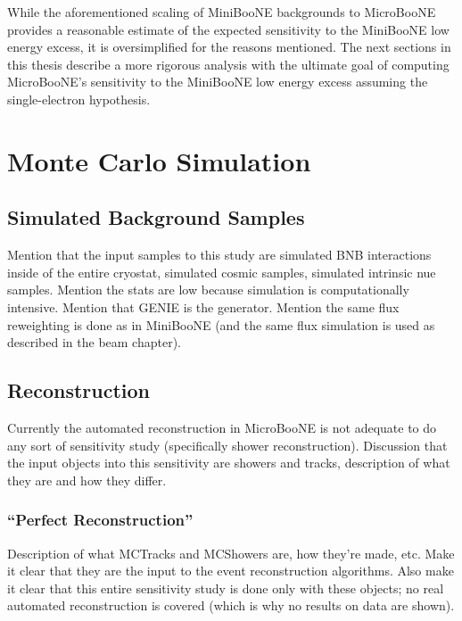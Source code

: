 While the aforementioned scaling of MiniBooNE backgrounds to MicroBooNE provides a reasonable estimate of the expected sensitivity to the MiniBooNE low energy excess, it is oversimplified for the reasons mentioned. The next sections in this thesis describe a more rigorous analysis with the ultimate goal of computing MicroBooNE's sensitivity to the MiniBooNE low energy excess assuming the single-electron hypothesis.














\section{Monte Carlo Simulation}

\subsection{Simulated Background Samples}
Mention that the input samples to this study are simulated BNB interactions inside of the entire cryostat, simulated cosmic samples, simulated intrinsic nue samples. Mention the stats are low because simulation is computationally intensive. Mention that GENIE is the generator. Mention the same flux reweighting is done as in MiniBooNE (and the same flux simulation is used as described in the beam chapter).

\subsection{Reconstruction}
Currently the automated reconstruction in MicroBooNE is not adequate to do any sort of sensitivity study (specifically shower reconstruction). Discussion that the input objects into this sensitivity are showers and tracks, description of what they are and how they differ. 
\subsubsection{``Perfect Reconstruction''}
Description of what {\sc MCTracks} and {\sc MCShowers} are, how they're made, etc. Make it clear that they are the input to the event reconstruction algorithms. Also make it clear that this entire sensitivity study is done only with these objects; no real automated reconstruction is covered (which is why no results on data are shown).



